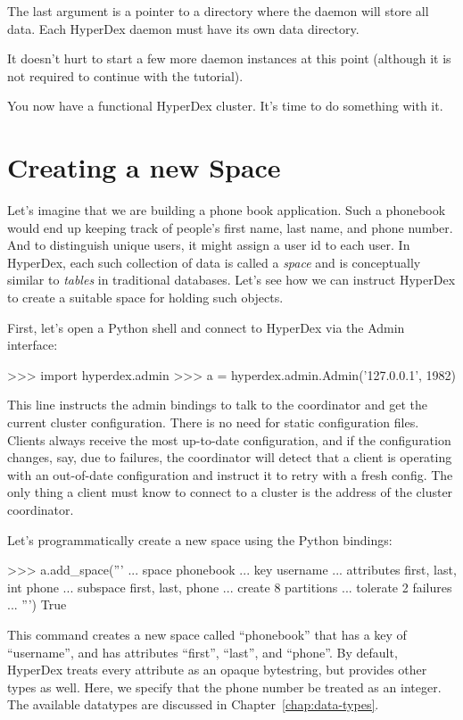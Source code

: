 The last argument is a pointer to a directory where the daemon will store all
data.  Each HyperDex daemon must have its own data directory.

It doesn't hurt to start a few more daemon instances at this point (although it
is not required to continue with the tutorial).

You now have a functional HyperDex cluster.  It's time to do something with it.

\section{Creating a new Space}
\label{sec:quick-start:space}

Let's imagine that we are building a phone book application.  Such a phonebook
would end up keeping track of people's first name, last name, and phone number.
And to distinguish unique users, it might assign a user id to each user.  In
HyperDex, each such collection of data is called a {\em space} and is
conceptually similar to {\em tables} in traditional databases.  Let's see how we
can instruct HyperDex to create a suitable space for holding such objects.

First, let's open a Python shell and connect to HyperDex via the Admin interface:

\begin{pythoncode}
>>> import hyperdex.admin
>>> a = hyperdex.admin.Admin('127.0.0.1', 1982)
\end{pythoncode}

This line instructs the admin bindings to talk to the coordinator and get the
current cluster configuration.  There is no need for static configuration files.
Clients always receive the most up-to-date configuration, and if the
configuration changes, say, due to failures, the coordinator will detect that a
client is operating with an out-of-date configuration and instruct it to retry
with a fresh config.  The only thing a client must know to connect to a cluster
is the address of the cluster coordinator.

Let's programmatically create a new space using the Python bindings:

\begin{pythoncode}
>>> a.add_space('''
... space phonebook
... key username
... attributes first, last, int phone
... subspace first, last, phone
... create 8 partitions
... tolerate 2 failures
... ''')
True
\end{pythoncode}

This command creates a new space called ``phonebook'' that has a key of
``username'', and has attributes ``first'', ``last'', and ``phone''.  By
default, HyperDex treats every attribute as an opaque bytestring, but provides
other types as well.  Here, we specify that the phone number be treated as an
integer.  The available datatypes are discussed in
Chapter~\ref{chap:data-types}.

